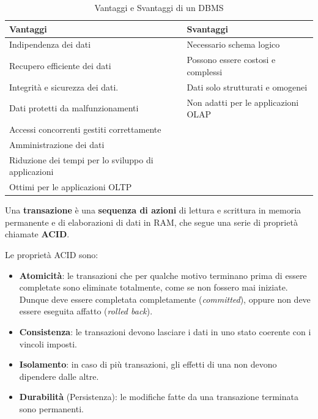 \documentclass[11pt, a4paper, titlepage, oneside]{scrbook}
\begin{document}
\begin{table}[htbp]
  \centering
  \caption{Vantaggi e Svantaggi di un DBMS}
  \label{tab:vantaggi_svantaggi}
  \begin{tabular}{|>{\centering\arraybackslash}p{}|>{\centering\arraybackslash}p{}|}
    \hline
    \textbf{Vantaggi} & \textbf{Svantaggi} \\
    \hline
    Indipendenza dei dati & Necessario schema logico \\
    \hline
    Recupero efficiente dei dati & Possono essere costosi e complessi \\
    \hline
    Integrità e sicurezza dei dati. & Dati solo strutturati e omogenei \\
    \hline
    Dati protetti da malfunzionamenti & Non adatti per le applicazioni OLAP \\
    \hline
    Accessi concorrenti gestiti correttamente & \\
    \hline
    Amministrazione dei dati & \\
    \hline
    Riduzione dei tempi per lo sviluppo di applicazioni & \\
    \hline
    Ottimi per le applicazioni OLTP & \\
    \hline
  \end{tabular}
\end{table}

\begin{Definizione}[Transazioni]
\label{def-transazioni}
Una \textbf{transazione} è una \textbf{sequenza di azioni} di lettura e scrittura in memoria permanente e di elaborazioni di dati in RAM, che segue una serie di proprietà chiamate \textbf{ACID}.
\end{Definizione}

Le proprietà ACID sono:
\begin{itemize}
    \item \textbf{Atomicità}: le transazioni che per qualche motivo terminano prima di essere completate sono eliminate totalmente, come se non fossero mai iniziate. Dunque deve essere completata completamente (\textit{committed}), oppure non deve essere eseguita affatto (\textit{rolled back}).
    \item \textbf{Consistenza}: le transazioni devono lasciare i dati in uno stato coerente con i vincoli imposti.
    \item \textbf{Isolamento}: in caso di più transazioni, gli effetti di una non devono dipendere dalle altre.
    \item \textbf{Durabilità} (Persistenza): le modifiche fatte da una transazione terminata sono permanenti.
\end{itemize}
\end{document}
